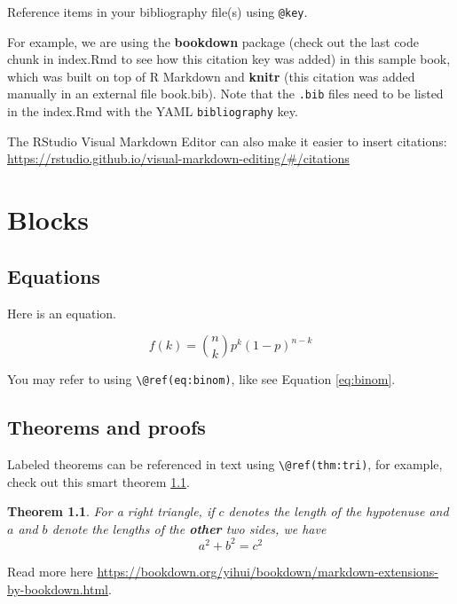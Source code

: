 \documentclass[
]{book}
\newtheorem{theorem}{Theorem}[chapter]
\theoremstyle{definition}
\theoremstyle{definition}
\theoremstyle{definition}
\theoremstyle{definition}
\theoremstyle{remark}
\begin{document}
Reference items in your bibliography file(s) using \texttt{@key}.

For example, we are using the \textbf{bookdown} package \citep{R-bookdown} (check out the last code chunk in index.Rmd to see how this citation key was added) in this sample book, which was built on top of R Markdown and \textbf{knitr} \citep{xie2015} (this citation was added manually in an external file book.bib).
Note that the \texttt{.bib} files need to be listed in the index.Rmd with the YAML \texttt{bibliography} key.

The RStudio Visual Markdown Editor can also make it easier to insert citations: \url{https://rstudio.github.io/visual-markdown-editing/\#/citations}

\hypertarget{blocks}{%
\chapter{Blocks}\label{blocks}}

\hypertarget{equations}{%
\section{Equations}\label{equations}}

Here is an equation.

\begin{equation} 
  f\left(k\right) = \binom{n}{k} p^k\left(1-p\right)^{n-k}
  \label{eq:binom}
\end{equation}

You may refer to using \texttt{\textbackslash{}@ref(eq:binom)}, like see Equation \eqref{eq:binom}.

\hypertarget{theorems-and-proofs}{%
\section{Theorems and proofs}\label{theorems-and-proofs}}

Labeled theorems can be referenced in text using \texttt{\textbackslash{}@ref(thm:tri)}, for example, check out this smart theorem \ref{thm:tri}.

\begin{theorem}
\protect\hypertarget{thm:tri}{}\label{thm:tri}For a right triangle, if \(c\) denotes the \emph{length} of the hypotenuse
and \(a\) and \(b\) denote the lengths of the \textbf{other} two sides, we have
\[a^2 + b^2 = c^2\]
\end{theorem}

Read more here \url{https://bookdown.org/yihui/bookdown/markdown-extensions-by-bookdown.html}.
\end{document}
